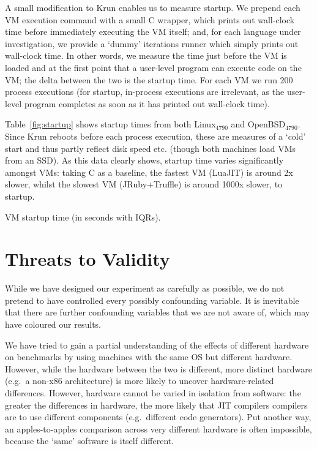 \documentclass[acmlarge]{acmart}\settopmatter{printfolios=true}
\newcommand{\krun}{Krun\xspace}
\newcommand{\bencherfive}{Linux$_\mathrm{4790}$\xspace}
\newcommand{\benchersix}{OpenBSD$_\mathrm{4790}$\xspace}
\begin{document}
A small modification to \krun enables us to measure startup. We prepend each VM
execution command with a small C wrapper, which prints out wall-clock time
before immediately executing the VM itself; and, for each language under
investigation, we provide a `dummy' iterations runner which simply prints out
wall-clock time. In other words, we measure the time just before the VM is loaded
and at the first point that a user-level program can execute code on the VM; the
delta between the two is the startup time. For each VM we run 200 process
executions (for startup, in-process executions are irrelevant,
as the user-level program completes as soon as it has printed out wall-clock
time).

Table~\ref{fig:startup} shows startup times from both \bencherfive and \benchersix. Since
\krun reboots before each process execution, these are measures of a `cold'
start and thus partly reflect disk speed etc. (though both machines load VMs
from an SSD). As this data clearly shows, startup time varies significantly amongst VMs:
taking C as a baseline, the fastest VM (LuaJIT) is around 2x slower, whilst the
slowest VM (JRuby+Truffle) is around 1000x slower, to startup.

\begin{table}[t]
\centering

\caption{VM startup time (in seconds with IQRs).}
\label{fig:startup}
\end{table}


\section{Threats to Validity}
\label{sec:threats}

While we have designed our experiment as carefully as possible, we do not
pretend to have controlled every possibly confounding variable. It
is inevitable that there are further confounding variables that
we are not aware of, which may have coloured our results.

We have tried to gain a partial understanding of the effects of different
hardware on benchmarks by using machines with the same OS but
different hardware. However, while the hardware between the two is
different, more distinct hardware (e.g.~a non-x86 architecture)
is more likely to uncover hardware-related differences.
However, hardware cannot be varied in isolation from software:
the greater the differences in hardware, the more likely that JIT compilers
compilers are to use different components (e.g.~different code generators).
Put another way, an apples-to-apples comparison across very different
hardware is often impossible, because the `same' software is itself different.
\end{document}
